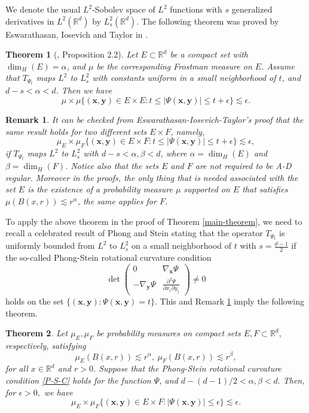 \documentclass[11pt]{article}
\newtheorem{theorem}{Theorem}[section]
\newtheorem{remark}{Remark}[section]
\newcommand{\1}{\mathbf{1}}
\begin{document}
We denote the usual $L^2$-Sobolev space of $L^2$ functions with $s$ generalized derivatives in $L^2(\mathbb{R}^d)$ by $L^2_s(\mathbb{R}^d)$. The following theorem was proved by Eswarathasan, Iosevich and Taylor in \cite{Alex}.
\begin{theorem} [\cite{Alex}, Proposition 2.2]
    Let $E\subset \mathbb{R}^d$ be a compact set with $\dim_H(E)=\alpha$, and $\mu$ be the corresponding Frostman measure on $E$. Assume that $T_{\Psi_t}$ maps $L^2$ to $L^2_s$ with constants uniform in a small neighborhood of $t$, and $ d-s < \alpha < d$. Then we have
    $$\mu \times \mu \{(\mathbf{x}, \mathbf{y}) \in E \times E : t \leq |\Psi(\mathbf{x},\mathbf{y})| \leq t+ \epsilon\} \lesssim \epsilon.$$

\end{theorem}

\begin{remark}\label{remarks}
    It can be checked from Eswarathasan-Iosevich-Taylor's proof that the same result holds for two different sets $E \times F$, namely,
    \begin{equation*}\mu_E \times \mu_F \{(\mathbf{x}, \mathbf{y}) \in E \times F : t \leq |\Psi(\mathbf{x},\mathbf{y})| \leq t+\epsilon\} \lesssim \epsilon,\end{equation*}
    if  $T_{\Psi_t}$ maps $L^2$ to $L^2_s$ with $ d-s < \alpha, \beta < d$, where $\alpha=\dim_H(E)$ and $\beta=\dim_H(F)$. Notice also that the sets $E$ and $F$ are not required to be A-D regular. Moreover in the proofs, the only thing that is needed associated with the set $E$ is the existence of a probability measure $\mu$ supported on $E$ that satisfies $\mu(B(x, r)) \lesssim r^{\alpha}$, the same applies for $F$.
\end{remark}
To apply the above theorem in the proof of Theorem \ref{main-theorem}, we need to recall a celebrated result of Phong and Stein \cite{PhS} stating that the operator $T_{\Psi_t}$ is uniformly bounded from $L^2$ to $L^2_s$ on a small neighborhood of $t$ with $s= \frac{d-1}{2}$ if the so-called Phong-Stein rotational curvature condition
\begin{equation}\label{P-S-C}\det \begin{pmatrix}
        0                      & \nabla_\mathbf{x}\Psi                             \\
        -\nabla_\mathbf{y}\Psi & \frac{\partial^2 \Psi}{\partial x_i \partial y_j}
    \end{pmatrix} \ne 0\end{equation}
holds on the set $\{(\mathbf{x}, \mathbf{y})\colon \Psi(\mathbf{x},\mathbf{y})=t\}$. This and Remark \ref{remarks} imply the following theorem.
\begin{theorem}\label{2.1.1}
    Let $\mu_E, \mu_F$ be probability measures on  compact sets $E, F \subset \mathbb R^d,$ respectively, satisfying
    \[\mu_E(B(x, r))\lesssim r^\alpha, ~\mu_F(B(x, r))\lesssim r^\beta,\]
    for all $x\in \mathbb{R}^d$ and $r>0$. Suppose that the Phong-Stein rotational curvature condition \eqref{P-S-C} holds for the function $\Psi$, and $d-(d-1)/2 < \alpha, \beta <d.$ Then, for $\epsilon>0,$  we have
    $$\mu_E \times \mu_F \{(\mathbf{x}, \mathbf{y}) \in E \times F : |\Psi(\mathbf{x},\mathbf{y})| \leq \epsilon\} \lesssim \epsilon.$$
\end{theorem}
\end{document}
